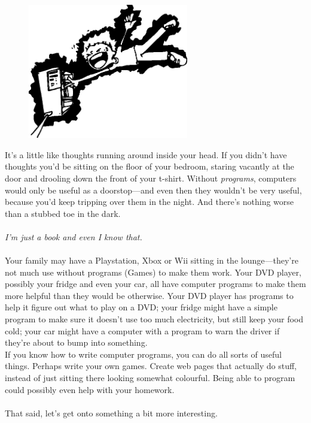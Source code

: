 \begin{figure}
  \begin{center}
\includegraphics*[width=70mm]{eps/electrocute.eps}
  \end{center}
\end{figure}

It's a little like thoughts running around inside your head. If you didn't have thoughts you'd be sitting on the floor of your bedroom, staring vacantly at the door and drooling down the front of your t-shirt. Without \emph{programs}, computers would only be useful as a doorstop---and even then they wouldn't be very useful, because you'd keep tripping over them in the night.  And there's nothing worse than a stubbed toe in the dark.
\\
\\
\emph{I'm just a book and even I know that.}
\\
\\
Your family may have a Playstation, Xbox or Wii sitting in the lounge---they're not much use without programs (Games) to make them work.  Your DVD player, possibly your fridge and even your car, all have computer programs to make them more helpful than they would be otherwise.  Your DVD player has programs to help it figure out what to play on a DVD; your fridge might have a simple program to make sure it doesn't use too much electricity, but still keep your food cold; your car might have a computer with a program to warn the driver if they're about to bump into something.\\
If you know how to write computer programs, you can do all sorts of useful things. Perhaps write your own games. Create web pages that actually do stuff, instead of just sitting there looking somewhat colourful.  Being able to program could possibly even help with your homework.\\
\\
That said, let's get onto something a bit more interesting.

